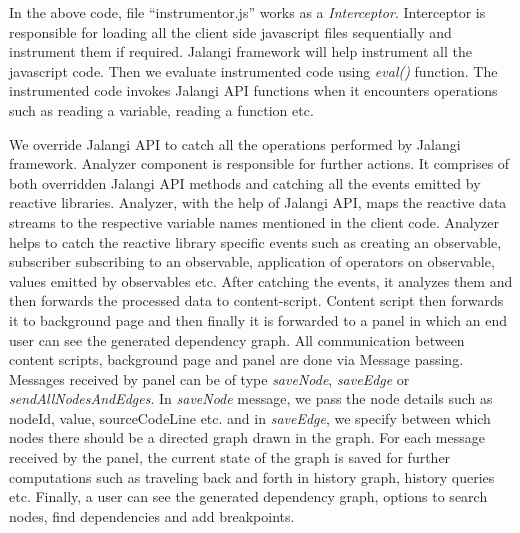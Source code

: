 In the above code, file ``instrumentor.js'' works as a \textit{Interceptor}. Interceptor is responsible for loading all the client side javascript files sequentially and instrument them if required. Jalangi framework will help instrument all the javascript code. Then we evaluate instrumented code using \textit{eval()} function. The instrumented code invokes Jalangi API functions when it encounters operations such as reading a variable, reading a function etc. 

We override Jalangi API to catch all the operations performed by Jalangi framework. Analyzer component is responsible for further actions. It comprises of both overridden Jalangi API methods and catching all the events emitted by reactive libraries. Analyzer, with the help of Jalangi API, maps the reactive data streams to the respective variable names mentioned in the client code. Analyzer helps to catch the reactive library specific events such as creating an observable, subscriber subscribing to an observable, application of operators on observable, values emitted by observables etc. After catching the events, it analyzes them and then forwards the processed data to content-script. Content script then forwards it to background page and then finally it is forwarded to a panel in which an end user can see the generated dependency graph. All communication between content scripts, background page and panel are done via Message passing. Messages received by panel can be of type \textit{saveNode}, \textit{saveEdge} or \textit{sendAllNodesAndEdges}. In \textit{saveNode} message, we pass the node details such as nodeId, value, sourceCodeLine etc. and in \textit{saveEdge}, we specify between which nodes there should be a directed graph drawn in the graph. For each message received by the panel, the current state of the graph is saved for further computations such as traveling back and forth in history graph, history queries etc. Finally, a user can see the generated dependency graph, options to search nodes, find dependencies and add breakpoints. 

